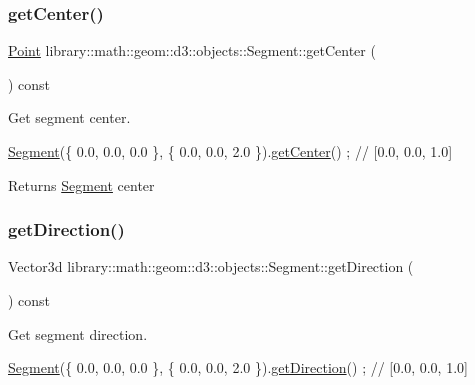 \subsubsection{\texorpdfstring{get\+Center()}{getCenter()}}
{\footnotesize\ttfamily \hyperlink{classlibrary_1_1math_1_1geom_1_1d3_1_1objects_1_1_point}{Point} library\+::math\+::geom\+::d3\+::objects\+::\+Segment\+::get\+Center (\begin{DoxyParamCaption}{ }\end{DoxyParamCaption}) const}



Get segment center. 


\begin{DoxyCode}
\hyperlink{classlibrary_1_1math_1_1geom_1_1d3_1_1objects_1_1_segment_a5562342d1edf2f52e37ce1bc138ee7d7}{Segment}(\{ 0.0, 0.0, 0.0 \}, \{ 0.0, 0.0, 2.0 \}).\hyperlink{classlibrary_1_1math_1_1geom_1_1d3_1_1objects_1_1_segment_a6788da2dd6ee48ded2da197c01ea7f3d}{getCenter}() ; \textcolor{comment}{// [0.0, 0.0, 1.0]}
\end{DoxyCode}


\begin{DoxyReturn}{Returns}
\hyperlink{classlibrary_1_1math_1_1geom_1_1d3_1_1objects_1_1_segment}{Segment} center 
\end{DoxyReturn}
\mbox{\label{classlibrary_1_1math_1_1geom_1_1d3_1_1objects_1_1_segment_afc15a855d660d67e96467466c4442bbc}} 
\subsubsection{\texorpdfstring{get\+Direction()}{getDirection()}}
{\footnotesize\ttfamily Vector3d library\+::math\+::geom\+::d3\+::objects\+::\+Segment\+::get\+Direction (\begin{DoxyParamCaption}{ }\end{DoxyParamCaption}) const}



Get segment direction. 


\begin{DoxyCode}
\hyperlink{classlibrary_1_1math_1_1geom_1_1d3_1_1objects_1_1_segment_a5562342d1edf2f52e37ce1bc138ee7d7}{Segment}(\{ 0.0, 0.0, 0.0 \}, \{ 0.0, 0.0, 2.0 \}).\hyperlink{classlibrary_1_1math_1_1geom_1_1d3_1_1objects_1_1_segment_afc15a855d660d67e96467466c4442bbc}{getDirection}() ; \textcolor{comment}{// [0.0, 0.0, 1.0]}
\end{DoxyCode}


